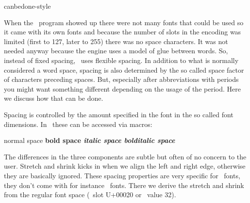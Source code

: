 
\environment canbedone-style


\startdocument
  [title=periods,
   color=middlered]

\startsectionlevel[title=Introduction]

When the \TEX\ program showed up there were not many fonts that could be used so
it came with its own fonts and because the number of slots in the encoding was
limited (first to 127, later to 255) there was no space characters. It was not
needed anyway because the engine uses a model of glue between words. So, instead
of fixed spacing, \TEX\ uses flexible spacing. In addition to what is normally
considered a word space, spacing is also determined by the so called space factor
of characters preceding spaces. But, especially after abbreviations with periods
you might want something different depending on the usage of the period. Here we
discuss how that can be done.

\stopsectionlevel

\startsectionlevel[title=Font related spacing]

Spacing is controlled by the amount specified in the font in the so called
font dimensions. In \CONTEXT\ these can be accessed via macros:

\starttabulate[||c|c|c|c|]
\BC                        \NC \tf normal space
                           \NC \bf bold space
                           \NC \it italic space
                           \NC \bi bolditalic space                    \NC \NR
\NC {}   \NC {\tf \expandafter}\the\interwordspace
                           \NC {\bf \expandafter}\the\interwordspace
                           \NC {\it \expandafter}\the\interwordspace
                           \NC {\bi \expandafter}\the\interwordspace   \NC \NR
\NC {} \NC {\tf \expandafter}\the\interwordstretch
                           \NC {\bf \expandafter}\the\interwordstretch
                           \NC {\it \expandafter}\the\interwordstretch
                           \NC {\bi \expandafter}\the\interwordstretch \NC \NR
\NC {}  \NC {\tf \expandafter}\the\interwordshrink
                           \NC {\it \expandafter}\the\interwordshrink
                           \NC {\bi \expandafter}\the\interwordshrink
                           \NC {\bf \expandafter}\the\interwordshrink  \NC \NR
\stoptabulate

The differences in the three components are subtle but often of no concern to the
user. Stretch and shrink kicks in when we align the left and right edge,
otherwise they are basically ignored. These spacing properties are very specific
for \TEX\ fonts, they don't come with for instance \OPENTYPE\ fonts. There we
derive the stretch and shrink from the regular font space (\UNICODE\ slot U+00020
or \ASCII\ value 32).

